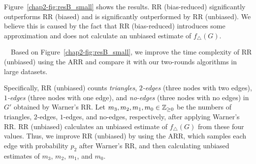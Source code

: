 Figure~\ref{chap2-fig:resB_small} shows the results.
\textsf{RR (bias-reduced)} significantly outperforms \textsf{RR (biased)} and is significantly outperformed by \textsf{RR (unbiased)}.
We believe 
this is caused by the fact that \textsf{RR (bias-reduced)} introduces some approximation and does not calculate an unbiased estimate of $f_\triangle(G)$.

\smallskip
{}~~Based on Figure~\ref{chap2-fig:resB_small}, we improve the time complexity of \textsf{RR (unbiased)} using the ARR and compare it with our two-rounds algorithms in large datasets.

Specifically, \textsf{RR (unbiased)} counts \textit{triangles}, \textit{$2$-edges} (three nodes with two edges), \textit{$1$-edges} (three nodes with one edge), and \textit{no-edges} (three nodes with no edges) in $G'$ obtained by Warner's RR.
Let $m_3, m_2, m_1, m_0 \in \mathbb{Z}_{\ge0}$ be the numbers of triangles, $2$-edges, $1$-edges, and no-edges, respectively, after applying Warner's RR.
\textsf{RR (unbiased)} calculates an unbiased estimate of $f_\triangle(G)$ from these four values.
Thus, we improve \textsf{RR (unbiased)} by using the ARR, which samples each edge with probability $p_2$ after Warner's RR, and then calculating unbiased estimates of $m_3$, $m_2$, $m_1$, and $m_0$.

